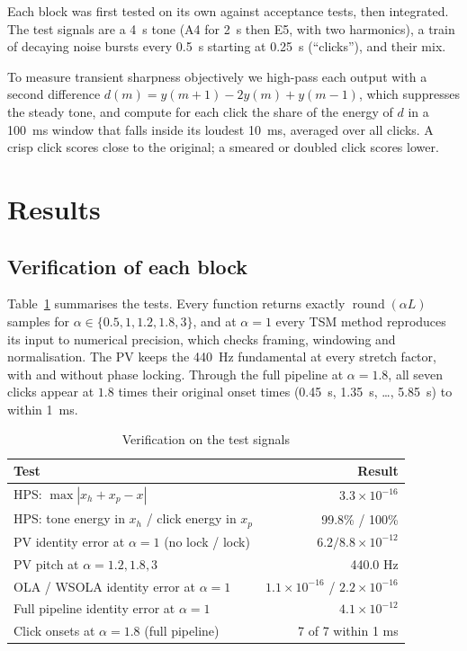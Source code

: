 \documentclass[conference]{IEEEtran}
\begin{document}
Each block was first tested on its own against acceptance tests, then integrated. The test signals are a 4~s tone (A4 for 2~s then E5, with two harmonics), a train of decaying noise bursts every 0.5~s starting at 0.25~s (``clicks''), and their mix.

To measure transient sharpness objectively we high-pass each output with a second difference $d(m)=y(m+1)-2y(m)+y(m-1)$, which suppresses the steady tone, and compute for each click the share of the energy of $d$ in a 100~ms window that falls inside its loudest 10~ms, averaged over all clicks. A crisp click scores close to the original; a smeared or doubled click scores lower.

\section{Results}
\label{sec:results}

\subsection{Verification of each block}
Table~\ref{tab:verify} summarises the tests. Every function returns exactly $\operatorname{round}(\alpha L)$ samples for $\alpha\in\{0.5,1,1.2,1.8,3\}$, and at $\alpha=1$ every TSM method reproduces its input to numerical precision, which checks framing, windowing and normalisation. The PV keeps the 440~Hz fundamental at every stretch factor, with and without phase locking. Through the full pipeline at $\alpha=1.8$, all seven clicks appear at $1.8$ times their original onset times (0.45~s, 1.35~s, \dots, 5.85~s) to within 1~ms.

\begin{table}[t]
\centering
\caption{Verification on the test signals}
\label{tab:verify}
\begin{tabular}{@{}lr@{}}
\toprule
Test & Result \\
\midrule
HPS: $\max|x_h+x_p-x|$ & $3.3\times10^{-16}$ \\
HPS: tone energy in $x_h$ / click energy in $x_p$ & 99.8\% / 100\% \\
PV identity error at $\alpha=1$ (no lock / lock) & $6.2 / 8.8\times10^{-12}$ \\
PV pitch at $\alpha=1.2, 1.8, 3$ & 440.0 Hz \\
OLA / WSOLA identity error at $\alpha=1$ & $1.1\times10^{-16}$ / $2.2\times10^{-16}$ \\
Full pipeline identity error at $\alpha=1$ & $4.1\times10^{-12}$ \\
Click onsets at $\alpha=1.8$ (full pipeline) & 7 of 7 within 1 ms \\
\bottomrule
\end{tabular}
\end{table}
\end{document}
